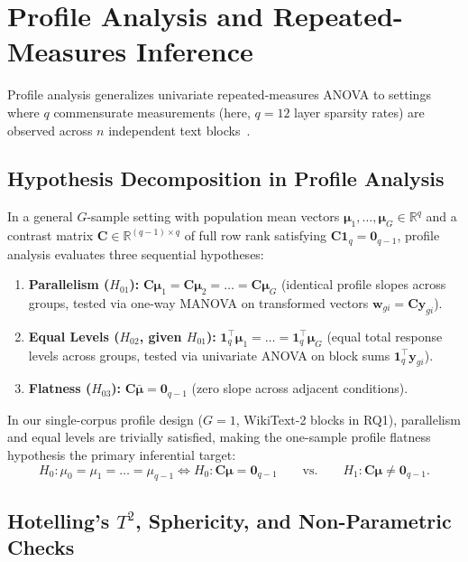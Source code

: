 \documentclass[12pt, a4paper, oneside]{report}
\theoremstyle{definition}
\newcommand{\vect}[1]{\mathbf{#1}}
\newcommand{\mat}[1]{\mathbf{#1}}
\newcommand{\R}{\mathbb{R}}
\begin{document}
\section{Profile Analysis and Repeated-Measures Inference}

Profile analysis generalizes univariate repeated-measures ANOVA to settings where $q$ commensurate measurements (here, $q = 12$ layer sparsity rates) are observed across $n$ independent text blocks~\cite{johnson2014applied, anderson2003introduction}.

\subsection{Hypothesis Decomposition in Profile Analysis}

In a general $G$-sample setting with population mean vectors $\boldsymbol{\mu}_1, \dots, \boldsymbol{\mu}_G \in \R^q$ and a contrast matrix $\mat{C} \in \R^{(q-1) \times q}$ of full row rank satisfying $\mat{C}\vect{1}_q = \vect{0}_{q-1}$, profile analysis evaluates three sequential hypotheses:
\begin{enumerate}
    \item \textbf{Parallelism ($H_{01}$):} $\mat{C}\boldsymbol{\mu}_1 = \mat{C}\boldsymbol{\mu}_2 = \dots = \mat{C}\boldsymbol{\mu}_G$ (identical profile slopes across groups, tested via one-way MANOVA on transformed vectors $\vect{w}_{gi} = \mat{C}\vect{y}_{gi}$).
    \item \textbf{Equal Levels ($H_{02}$, given $H_{01}$):} $\vect{1}_q^\top \boldsymbol{\mu}_1 = \dots = \vect{1}_q^\top \boldsymbol{\mu}_G$ (equal total response levels across groups, tested via univariate ANOVA on block sums $\vect{1}_q^\top \vect{y}_{gi}$).
    \item \textbf{Flatness ($H_{03}$):} $\mat{C}\bar{\boldsymbol{\mu}} = \vect{0}_{q-1}$ (zero slope across adjacent conditions).
\end{enumerate}
In our single-corpus profile design ($G = 1$, WikiText-2 blocks in RQ1), parallelism and equal levels are trivially satisfied, making the one-sample profile flatness hypothesis the primary inferential target:
\begin{equation}
    H_0 : \mu_0 = \mu_1 = \dots = \mu_{q-1} \iff H_0 : \mat{C}\boldsymbol{\mu} = \vect{0}_{q-1}
    \qquad \text{vs.} \qquad
    H_1 : \mat{C}\boldsymbol{\mu} \neq \vect{0}_{q-1}.
    \label{eq:rq1_flatness_hyp}
\end{equation}

\subsection{Hotelling's \texorpdfstring{$T^2$}{T2}, Sphericity, and Non-Parametric Checks}
\end{document}
